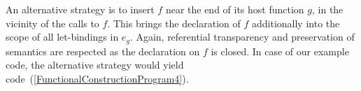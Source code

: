 An alternative strategy is to insert $f$ near the end of its host
function $g$, in the vicinity of the calls to $f$. This brings the
declaration of $f$ additionally into the scope of all let-bindings in
$e_g$. Again, referential transparency and preservation of semantics
are respected as the declaration on $f$ is closed. In case of our
example code, the alternative strategy would yield
code~(\ref{FunctionalConstructionProgram4}).

